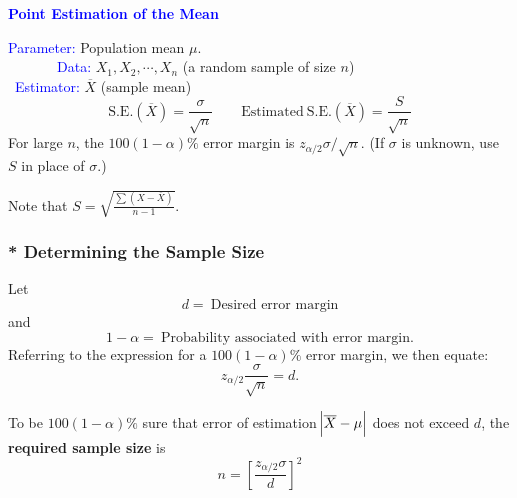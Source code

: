 \documentclass[12pt,openany]{book}
\theoremstyle{definition}
\newcommand{\dispsty}{\displaystyle}
\newcommand{\SE}{\text{S.E.}}
\begin{document}
	\begin{tcolorbox}[colback=white]\begin{center}
			\textcolor{blue}{\bf Point Estimation of the Mean}
		\end{center}
		\textcolor{blue}{Parameter:} Population mean $\mu$. \\
		\textcolor{blue}{\ \ \ \ \ \  \ Data:} $X_1,X_2,\cdots,X_n$ (a random sample of size $n$)\\
		\textcolor{blue}{\ Estimator:} $\overline{X}$ (sample mean) \\
		\[
		\SE(\overline{X})=\frac{\sigma}{\sqrt{n}}\qquad\text{Estimated}\ \SE(\overline{X}) = \frac{S}{\sqrt{n}}
		\] For large $n$, the $100(1-\alpha)\%$ error margin is $z_{\alpha/2}\sigma/\sqrt{n}$. (If $\sigma$ is unknown, use $S$ in place of $\sigma$.)
	\end{tcolorbox} Note that $\dispsty S=\sqrt{\frac{\sum(X-\overline{X})}{n-1}}$.
	
	\subsubsection*{* Determining the Sample Size}
	Let \[
	d =\ \text{Desired error margin}
	\] and \[
	1-\alpha =\ \text{Probability associated with error margin}.
	\] Referring to the expression for a $100(1-\alpha)\%$ error margin, we then equate: \[
	z_{\alpha/2}\frac{\sigma}{\sqrt{n}}=d.
	\]
	\begin{tcolorbox}[colback=white]
		To be $100(1-\alpha)\%$ sure that error of estimation $\abs{\overline{X}-\mu}$ does not exceed $d$, the \textbf{required sample size} is \[
		n=\left[\frac{z_{\alpha/2}\sigma}{d}\right]^2
		\]
	\end{tcolorbox}
	
\end{document}
